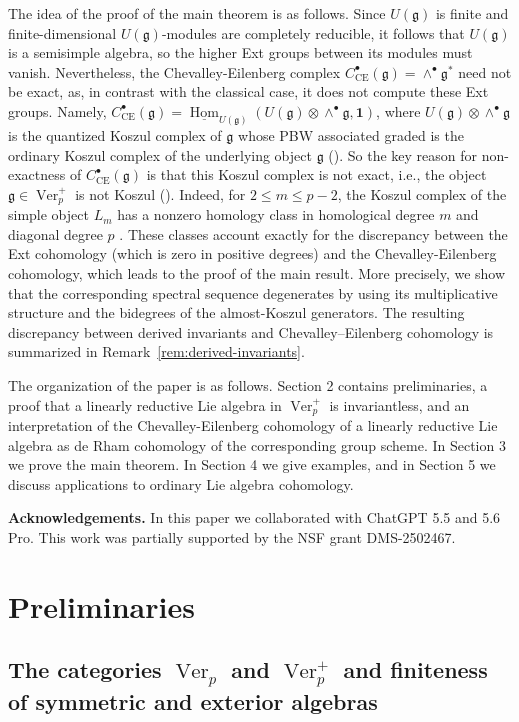 \documentclass[12pt]{amsart}
\theoremstyle{remark}
\DeclareMathOperator{\Ver}{Ver}
\DeclareMathOperator{\Hom}{Hom}
\newcommand{\g}{\mathfrak g}
\newcommand{\one}{\mathbf 1}
\newcommand{\CE}{\mathrm{CE}}
\newcommand{\uHom}{\underline{\Hom}}
\begin{document}
The idea of the proof of the main theorem is as follows. Since $U(\g)$ is finite and finite-dimensional $U(\g)$-modules are completely reducible, it follows that $U(\g)$ is a semisimple algebra, so 
the higher Ext groups between its modules must vanish. Nevertheless, the Chevalley-Eilenberg complex $C_{\CE}^\bullet(\g)=\wedge^\bullet \g^*$ 
need not be exact, as, in contrast with the classical case, it does not compute these Ext groups. 
Namely, $C_{\CE}^\bullet(\g)=\uHom_{U(\g)}(U(\g)\otimes \wedge^\bullet \g,\one)$, 
where $U(\g)\otimes \wedge^\bullet \g$ is the quantized Koszul complex of $\g$ 
whose PBW associated graded is the ordinary Koszul complex of the underlying object $\g$ (\cite{Eti18}). So the key reason for non-exactness of $C_{\CE}^\bullet(\g)$ 
is that this Koszul complex is not exact, i.e., the object $\g\in \Ver_p^+$ is not Koszul (\cite{Eti18}). Indeed, for $2\leq m\leq p-2$, the Koszul complex of the simple object $L_m$ has a nonzero homology class in homological degree $m$ and
diagonal degree $p$ \cite[Proposition~5.1]{Eti18}.  These classes account
exactly for the discrepancy between the Ext cohomology (which is zero in positive degrees) and
the Chevalley-Eilenberg cohomology, which leads to the proof of the main result.
More precisely, we show that the corresponding spectral sequence degenerates by using its multiplicative structure and the bidegrees of the almost-Koszul generators.
The resulting discrepancy between derived invariants and Chevalley--Eilenberg
cohomology is summarized in Remark~\ref{rem:derived-invariants}.

The organization of the paper is as follows. Section 2 contains preliminaries, a proof that a linearly reductive Lie algebra in $\Ver_p^+$ is invariantless, and an interpretation of the Chevalley-Eilenberg cohomology of a linearly reductive Lie algebra as de Rham cohomology of the corresponding group scheme.
In Section 3 we prove the main theorem. In Section 4 we give examples, and in Section 5 we discuss applications to ordinary Lie algebra cohomology. 

{\bf Acknowledgements.} In this paper we collaborated with ChatGPT 5.5 and 5.6 Pro. This work was partially supported by the NSF grant DMS-2502467. 

\section{Preliminaries}

\subsection{The categories $\Ver_p$ and \texorpdfstring{$\Ver_p^+$}{Ver-p-plus} and finiteness of symmetric and exterior algebras}
\end{document}
